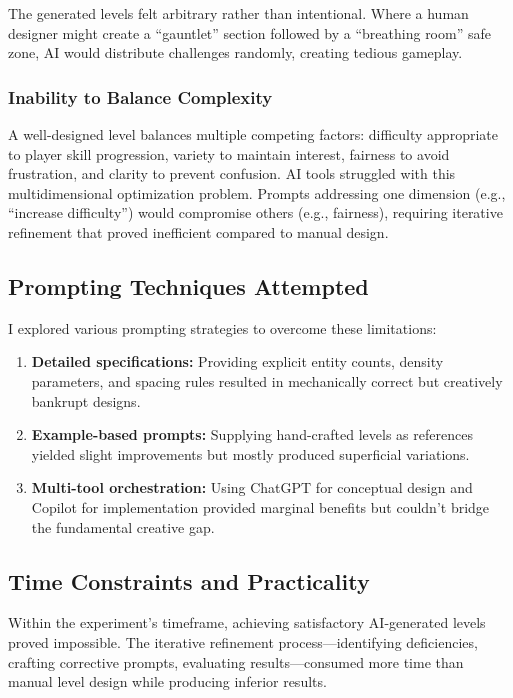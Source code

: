 \documentclass[12pt,a4paper]{article}
\begin{document}
The generated levels felt arbitrary rather than intentional. Where a human designer might create a ``gauntlet'' section followed by a ``breathing room'' safe zone, AI would distribute challenges randomly, creating tedious gameplay.

\subsubsection*{Inability to Balance Complexity}

A well-designed level balances multiple competing factors: difficulty appropriate to player skill progression, variety to maintain interest, fairness to avoid frustration, and clarity to prevent confusion. AI tools struggled with this multidimensional optimization problem. Prompts addressing one dimension (e.g., ``increase difficulty'') would compromise others (e.g., fairness), requiring iterative refinement that proved inefficient compared to manual design.

\subsection{Prompting Techniques Attempted}

I explored various prompting strategies to overcome these limitations:

\begin{enumerate}
    \item \textbf{Detailed specifications:} Providing explicit entity counts, density parameters, and spacing rules resulted in mechanically correct but creatively bankrupt designs.
    
    \item \textbf{Example-based prompts:} Supplying hand-crafted levels as references yielded slight improvements but mostly produced superficial variations.
    
    \item \textbf{Multi-tool orchestration:} Using ChatGPT for conceptual design and Copilot for implementation provided marginal benefits but couldn't bridge the fundamental creative gap.
\end{enumerate}

\subsection{Time Constraints and Practicality}

Within the experiment's timeframe, achieving satisfactory AI-generated levels proved impossible. The iterative refinement process---identifying deficiencies, crafting corrective prompts, evaluating results---consumed more time than manual level design while producing inferior results. 
\end{document}
